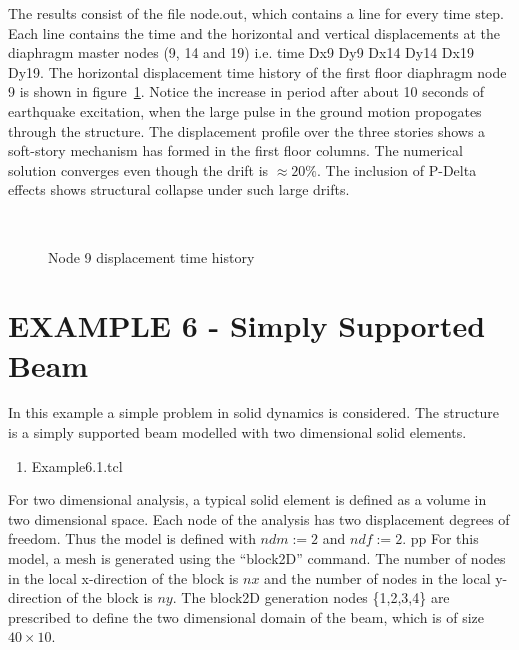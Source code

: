 \documentclass[12pt]{article}
\begin{document}
\vspace{0.2in} 

The results consist of the file node.out, which contains a line for
every time step. Each line contains the time and the horizontal and
vertical displacements at the diaphragm master nodes (9, 14 and 19)
i.e. time Dx9 Dy9 Dx14 Dy14 Dx19 Dy19. The horizontal displacement
time history of the first floor diaphragm node 9 is shown in
figure~\ref{example4disp}. Notice the increase in period
after about 10 seconds of earthquake excitation, when the large pulse
in the ground motion propogates through the structure. The
displacement profile over the three stories shows a soft-story
mechanism has formed in the first floor columns. The numerical
solution converges even though the drift is
$\approx 20 \%$. The inclusion of P-Delta effects shows
structural collapse under such large drifts.

\begin{figure}[h]
\begin{center}
\leavevmode
\hbox{%
\epsfxsize=4.0in
\epsfysize=2.8in
}
\end{center}
\caption{Node 9 displacement time history}
\label{example4disp}
\end{figure}


\clearpage
\section {EXAMPLE 6 - Simply Supported Beam}

In this example a simple problem in solid dynamics is considered.
The structure is a simply supported beam modelled with two dimensional
solid elements.

\vspace{0.2in}  
\begin{enumerate} 
\item Example6.1.tcl
\end{enumerate}

\vspace{0.2in} 

For two dimensional analysis, a typical solid element is defined as a volume 
in two dimensional space.  Each node of the analysis has two displacement
degrees of freedom.  Thus the model is defined with 
$ndm := 2$ and $ndf := 2$.
pp
For this model, a mesh is generated using the ``block2D'' command.  The number of 
nodes in the local x-direction of the block is $nx$ and
the number of nodes in the local y-direction of the block is $ny$.
The block2D generation nodes \{1,2,3,4\} are prescribed to define 
the two dimensional domain of the beam, which is of size $40\times10$.
\end{document}
